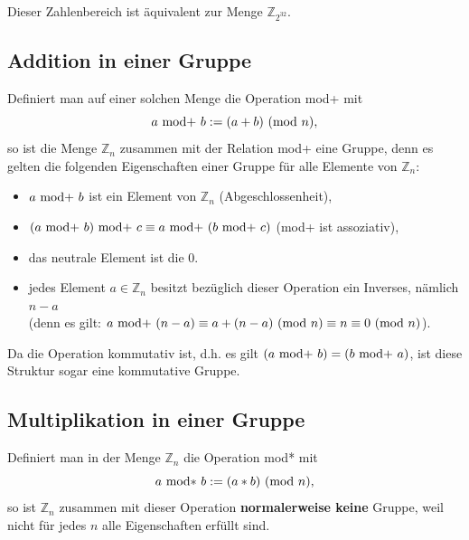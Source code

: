 \begin{refsegment}
Dieser Zahlenbereich ist äquivalent zur Menge $\mathbb{Z}_{2^{32}}$.


\subsection{Addition in einer Gruppe}

Definiert man auf einer solchen Menge die Operation mod+ mit
$$ a {\rm ~mod+~} b := (a + b){\rm ~(mod~}n) , $$
so ist die Menge $\mathbb{Z}_n$ zusammen mit der Relation mod+ eine Gruppe, denn es
gelten die folgenden Eigenschaften einer Gruppe für alle Elemente von $\mathbb{Z}_n$:
\begin{itemize}
    \item   $ a {\rm ~mod+~} b$ ist ein Element von $\mathbb{Z}_n$  (Abgeschlossenheit),
    \item   $(a {\rm ~mod+~} b) {\rm ~mod+~} c \equiv a {\rm ~mod+~} (b {\rm ~mod+~} c)$  (mod+ ist assoziativ),
    \item   das neutrale Element ist die $0$.
  \item   jedes Element $a \in \mathbb{Z}_n$ besitzt bezüglich dieser Operation ein Inverses, nämlich $n-a$\\
                (denn es gilt: $a {\rm ~mod+~} (n-a) \equiv a + (n-a){\rm ~(mod~}n) \equiv n \equiv 0 {\rm ~(mod~}n)$).
\end{itemize}
Da die Operation kommutativ ist, d.h. es gilt $(a {\rm ~mod+~} b) = (b {\rm ~mod+~} a)$, ist diese Struktur  sogar
eine \glqq kommutative Gruppe\grqq.


\subsection{Multiplikation in einer Gruppe}

Definiert man in der Menge $\mathbb{Z}_n$ die Operation mod* mit
$$ a {\rm ~mod*~} b := (a * b){\rm ~(mod~}n), $$
so ist $\mathbb{Z}_n$ zusammen mit dieser Operation {\bf normalerweise keine} Gruppe, weil
nicht für jedes $n$ alle Eigenschaften erfüllt sind.


\end{refsegment}
